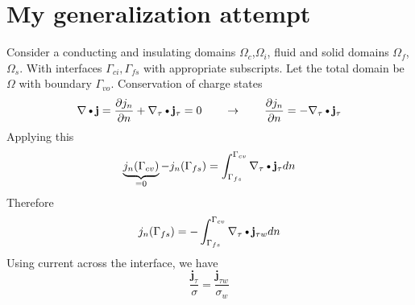 \documentclass[11pt]{article}
\newcommand{\PD}{\partial}
\newcommand{\J}{\mathbf{j}}
\newcommand{\DOT}{\text{\textbullet}}
\begin{document}
\newpage

\section{My generalization attempt}
Consider a conducting and insulating domains $\Omega_c$,$\Omega_i$, fluid and solid domains $\Omega_f$,$\Omega_s$. With interfaces $\Gamma_{ci},\Gamma_{fs}$ with appropriate subscripts. Let the total domain be $\Omega$ with boundary $\Gamma_{vo}$. Conservation of charge states
\begin{equation}
  \nabla \DOT \J =
  \frac{\PD j_n}{\PD n} + 
  \nabla_{\tau} \DOT \J_{\tau} = 0
  \qquad
  \rightarrow
  \qquad
  \frac{\PD j_n}{\PD n} = - 
  \nabla_{\tau} \DOT \J_{\tau} 
\end{equation}
Applying this 
\begin{equation}
  \underbrace{j_n (\Gamma_{cv})}_{=0} - j_n (\Gamma_{fs})
  =
  \int_{\Gamma_{fs}}^{\Gamma_{cv}} \nabla_{\tau} \DOT \J_{\tau}  dn
\end{equation}
Therefore
\begin{equation}
  j_n (\Gamma_{fs})
  =
  - \int_{\Gamma_{fs}}^{\Gamma_{cv}} \nabla_{\tau} \DOT \J_{\tau w}  dn
\end{equation}
Using current across the interface, we have
\begin{equation}
  \frac{\J_{\tau}}{\sigma} = \frac{\J_{\tau w}}{\sigma_w}
\end{equation}
\end{document}

